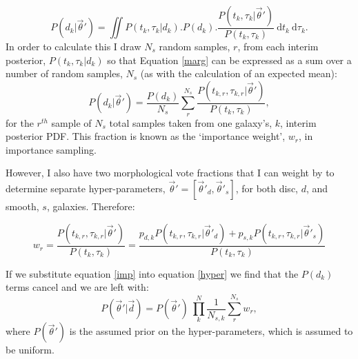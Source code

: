 \begin{equation}\label{marg}
P(d_k|\vec{\theta}') = \iint  \! P(t_k, \tau_k|d_k) . P(d_k) . \frac{P(t_k, \tau_k|\vec{\theta}')}{P(t_k, \tau_k)} \ \mathrm{d}t_k ~ \mathrm{d}\tau_k.
\end{equation}
In order to calculate this I draw $N_s$ random samples, $r$, from each interim posterior, $P(t_k, \tau_k|d_k)$ so that Equation \ref{marg} can be expressed as a sum over a number of random samples, $N_s$ (as with the calculation of an expected mean):
\begin{equation}\label{imp}
P(d_k|\vec{\theta}') = \frac{P(d_k)}{N_s} \sum_r^{N_s} \frac{P(t_{k,r}, \tau_{k,r}|\vec{\theta}')}{P(t_k, \tau_k)},
\end{equation}
for the $r^{th}$ sample of $N_s$ total samples taken from one galaxy's, $k$,  interim posterior PDF. This fraction is known as the `importance weight', $w_r$, in importance sampling. 

However, I also have two morphological vote fractions that I can weight by to determine separate hyper-parameters, $\vec{\theta}' = [\vec{\theta}'_d, \vec{\theta}'_s]$, for both disc, $d$, and smooth, $s$, galaxies. Therefore:

\begin{equation}\label{morphimp}
w_r = \frac{P(t_{k,r}, \tau_{k,r}|\vec{\theta}')}{P(t_k, \tau_k)} =  \frac{p_{d,k} P(t_{k,r}, \tau_{k,r}|\vec{\theta}'_d) + p_{s,k} P(t_{k,r}, \tau_{k,r}|\vec{\theta}'_s)}{P(t_k, \tau_k)}
\end{equation} 

If we substitute equation \ref{imp} into equation \ref{hyper} we find that the $P(d_k)$ terms cancel and we are left with:
\begin{equation}
P(\vec{\theta}'|\vec{d}) = P(\vec{\theta}')~\prod_k^N \frac{1}{N_{s,k}} \sum_r^{N_s} w_r ,
\end{equation}
where $P(\vec{\theta}')$ is the assumed prior on the hyper-parameters, which is assumed to be uniform.

